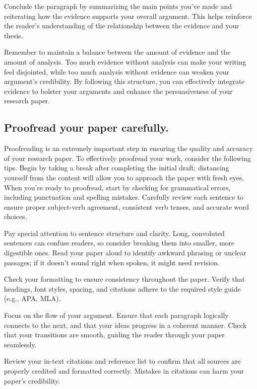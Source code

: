 \documentclass[
  b5paper]{book}
\begin{document}
Conclude the paragraph by summarizing the main points you've made and reiterating how the evidence supports your overall argument. This helps reinforce the reader's understanding of the relationship between the evidence and your thesis.

Remember to maintain a balance between the amount of evidence and the amount of analysis. Too much evidence without analysis can make your writing feel disjointed, while too much analysis without evidence can weaken your argument's credibility. By following this structure, you can effectively integrate evidence to bolster your arguments and enhance the persuasiveness of your research paper.

\hypertarget{proofread-your-paper-carefully.}{%
\subsection*{Proofread your paper carefully.}\label{proofread-your-paper-carefully.}}

Proofreading is an extremely important step in ensuring the quality and accuracy of your research paper. To effectively proofread your work, consider the following tips. Begin by taking a break after completing the initial draft; distancing yourself from the content will allow you to approach the paper with fresh eyes. When you're ready to proofread, start by checking for grammatical errors, including punctuation and spelling mistakes. Carefully review each sentence to ensure proper subject-verb agreement, consistent verb tenses, and accurate word choices.

Pay special attention to sentence structure and clarity. Long, convoluted sentences can confuse readers, so consider breaking them into smaller, more digestible ones. Read your paper aloud to identify awkward phrasing or unclear passages; if it doesn't sound right when spoken, it might need revision.

Check your formatting to ensure consistency throughout the paper. Verify that headings, font styles, spacing, and citations adhere to the required style guide (e.g., APA, MLA).

Focus on the flow of your argument. Ensure that each paragraph logically connects to the next, and that your ideas progress in a coherent manner. Check that your transitions are smooth, guiding the reader through your paper seamlessly.

Review your in-text citations and reference list to confirm that all sources are properly credited and formatted correctly. Mistakes in citations can harm your paper's credibility.
\end{document}

